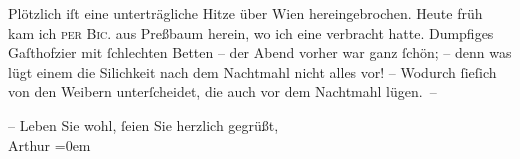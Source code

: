 \pstart
           Plötzlich iſt eine unterträgliche Hitze über Wien
               hereingebrochen. {\pb}Heute{ }früh kam ich \textsc{per}{ }\textsc{Bic.} aus Preßbaum
               herein, wo ich eine \label{K_L02961-2v}\label{K_L02961-2} verbracht hatte. Dumpfiges Gaſthofzi{\geminationm}er mit{ }ſchlechten Betten – der Abend
               vorher war ganz{ }ſchön; – denn was lügt einem die Si{\geminationn}lichkeit nach dem {\pb}Nachtmahl \introOben{}nicht\introOben{} alles vor! – Wodurch ſieſich von den
               Weibern unterſcheidet, die auch vor dem Nachtmahl lügen. –\pend
           
\pstart
           – Leben Sie wohl,{ }ſeien Sie herzlich gegrüßt, {\\[\baselineskip]}\spacefill\mbox{Arthur}\pend
           \leftskip=0em{}\endnumbering{}  \newcommand{\dateiname}{L02961}\newcommand{\titel}{Arthur Schnitzler an Felix Salten, 17. 8. 1893}\newcommand{\editorInnen}{Martin Anton Müller und Laura Untner}
